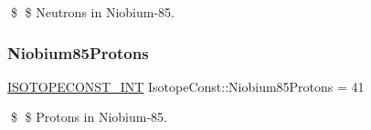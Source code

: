 \$ \$ Neutrons in Niobium-\/85. \mbox{\label{group___isotope_const-_niobium-_nb85_ga234a2fb9e29d169794267fbfe3e3e28e}} 
\subsubsection{\texorpdfstring{Niobium85\+Protons}{Niobium85Protons}}
{\footnotesize\ttfamily \mbox{\hyperlink{group___isotope_const-_macros_ga5f18360b3e99483a35c32d789e62621c}{I\+S\+O\+T\+O\+P\+E\+C\+O\+N\+S\+T\+\_\+\+I\+NT}} Isotope\+Const\+::\+Niobium85\+Protons = 41}

\$ \$ Protons in Niobium-\/85. 